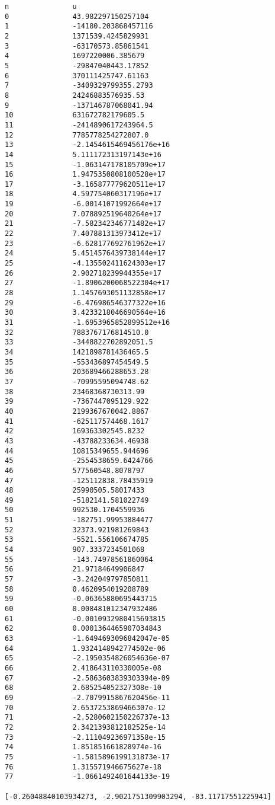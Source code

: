 \documentclass[11pt]{article}
\begin{document}
\begin{Verbatim}[commandchars=\\\{\}]
n               u
0               43.982297150257104
1               -14180.203868457116
2               1371539.4245829931
3               -63170573.85861541
4               1697220006.385679
5               -29847040443.17852
6               370111425747.61163
7               -3409329799355.2793
8               24246883576935.53
9               -137146787068041.94
10              631672782179605.5
11              -2414890617243964.5
12              7785778254272807.0
13              -2.1454615469456176e+16
14              5.111172313197143e+16
15              -1.063147178105709e+17
16              1.9475350808100528e+17
17              -3.165877779620511e+17
18              4.597754060317196e+17
19              -6.00141071992664e+17
20              7.078892519640264e+17
21              -7.582342346771482e+17
22              7.407881313973412e+17
23              -6.628177692761962e+17
24              5.4514576439738144e+17
25              -4.135502411624303e+17
26              2.902718239944355e+17
27              -1.8906200068522304e+17
28              1.1457693051132858e+17
29              -6.476986546377322e+16
30              3.4233218046690564e+16
31              -1.6953965852899512e+16
32              7883767176814510.0
33              -3448822702892051.5
34              1421898781436465.5
35              -553436897454549.5
36              203689466288653.28
37              -70995595094748.62
38              23468368730313.99
39              -7367447095129.922
40              2199367670042.8867
41              -625117574468.1617
42              169363302545.8232
43              -43788233634.46938
44              10815349655.944696
45              -2554538659.6424766
46              577560548.8078797
47              -125112838.78435919
48              25990505.58017433
49              -5182141.581022749
50              992530.1704559936
51              -182751.99953884477
52              32373.921981269843
53              -5521.556106674785
54              907.3337234501068
55              -143.74978561860064
56              21.97184649906847
57              -3.242049797850811
58              0.4620954019208789
59              -0.06365880695443715
60              0.008481012347932486
61              -0.0010932980415693815
62              0.0001364465907034843
63              -1.6494693096842047e-05
64              1.9324148942774502e-06
65              -2.1950354826054636e-07
66              2.418643110330005e-08
67              -2.5863603839303394e-09
68              2.685254052327308e-10
69              -2.7079915867620456e-11
70              2.6537253869466307e-12
71              -2.5280602150226737e-13
72              2.3421393812182525e-14
73              -2.111049236971358e-15
74              1.851851661828974e-16
75              -1.5815896199131873e-17
76              1.315571946675627e-18
77              -1.0661492401644133e-19

[-0.26048840103934273, -2.9021751309903294, -83.11717551225941]
    \end{Verbatim}


    
    
    
\end{document}
